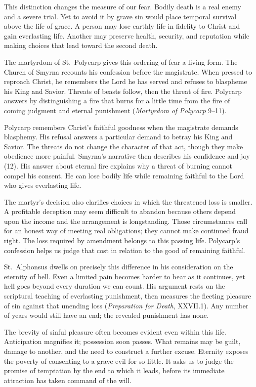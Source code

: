 This distinction changes the measure of our fear. Bodily death is a real enemy and a severe trial. Yet to avoid it by grave sin would place temporal survival above the life of grace. A person may lose earthly life in fidelity to Christ and gain everlasting life. Another may preserve health, security, and reputation while making choices that lead toward the second death.

The martyrdom of St.~Polycarp gives this ordering of fear a living form. The Church of Smyrna recounts his confession before the magistrate. When pressed to reproach Christ, he remembers the Lord he has served and refuses to blaspheme his King and Savior. Threats of beasts follow, then the threat of fire. Polycarp answers by distinguishing a fire that burns for a little time from the fire of coming judgment and eternal punishment (\emph{Martyrdom of Polycarp} 9--11).

Polycarp remembers Christ's faithful goodness when the magistrate demands blasphemy. His refusal answers a particular demand to betray his King and Savior. The threats do not change the character of that act, though they make obedience more painful. Smyrna's narrative then describes his confidence and joy (12). His answer about eternal fire explains why a threat of burning cannot compel his consent. He can lose bodily life while remaining faithful to the Lord who gives everlasting life.

The martyr's decision also clarifies choices in which the threatened loss is smaller. A profitable deception may seem difficult to abandon because others depend upon the income and the arrangement is longstanding. Those circumstances call for an honest way of meeting real obligations; they cannot make continued fraud right. The loss required by amendment belongs to this passing life. Polycarp's confession helps us judge that cost in relation to the good of remaining faithful.

St.~Alphonsus dwells on precisely this difference in his consideration on the eternity of hell. Even a limited pain becomes harder to bear as it continues, yet hell goes beyond every duration we can count. His argument rests on the scriptural teaching of everlasting punishment, then measures the fleeting pleasure of sin against that unending loss (\emph{Preparation for Death}, XXVII.1). Any number of years would still have an end; the revealed punishment has none.

The brevity of sinful pleasure often becomes evident even within this life. Anticipation magnifies it; possession soon passes. What remains may be guilt, damage to another, and the need to construct a further excuse. Eternity exposes the poverty of consenting to a grave evil for so little. It asks us to judge the promise of temptation by the end to which it leads, before its immediate attraction has taken command of the will.

